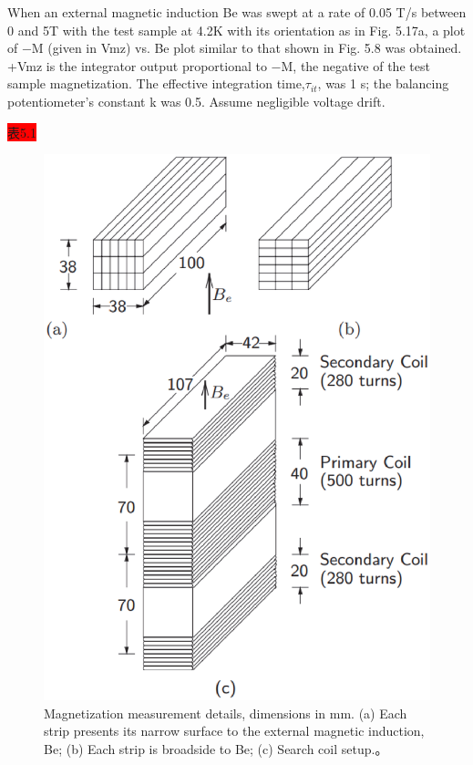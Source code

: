 When an external magnetic induction Be was swept at a rate of 0.05 T/s between
0 and 5T with the test sample at 4.2K with its orientation as in Fig. 5.17a, a
plot of −M (given in Vmz) vs. Be plot similar to that shown in Fig. 5.8 was
obtained. +Vmz is the integrator output proportional to −M, the negative of
the test sample magnetization. The effective integration time,$\tau_{it}$, was 1 s; the
balancing potentiometer’s constant k was 0.5. Assume negligible voltage drift.

\colorbox{red}{表5.1}


\begin{figure}[htbp]
	\centering
	\includegraphics[scale=0.6]{chpt5/figs/fig5.17.eps}
	\caption{Magnetization measurement details, dimensions in mm.
		(a) Each strip presents its narrow surface to the external magnetic
		induction, Be; (b) Each strip is broadside to Be; (c) Search coil setup.。}
\end{figure}

